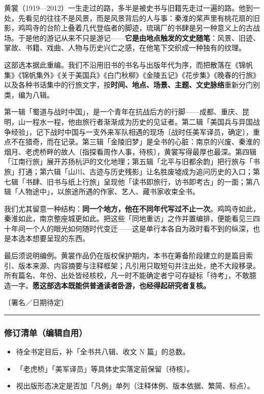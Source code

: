 \documentclass[UTF8,fontset=none,zihao=-4,a4paper]{ctexart}
\begin{document}
黄裳（1919—2012）一生走过的路，多半是被史书与旧籍先走过一遍的路。他到一处，先看见的往往不是风景，而是风景背后的人与事：秦淮的桨声里有桃花扇的旧影，鸡鸣寺的台阶上叠着几代登临者的脚迹，琉璃厂的书肆是另一种意义上的古战场。于是他的游记从来不只是游记——\textbf{它是由地点触发的文史随笔}：风景、旧迹、掌故、书籍、戏曲、人物与历史兴亡之感，在他笔下交织成一种独有的纹理。


这部选本据此重编。我们不沿用旧书的书名与出版年代为序，而把散落在《锦帆集》《锦帆集外》《关于美国兵》《白门秋柳》《金陵五记》《花步集》《晚春的行旅》以及各种书话集中的行旅文字，按\textbf{时间、地点、场景、主题、文史脉络}重新分门别类，编为八辑。


第一辑「蜀道与战时中国」，是一个青年在抗战后方的行脚——成都、重庆、昆明，山一程水一程，他由旅行者渐渐成为历史的见证者。第二辑「美国兵与异国战争经验」，记下战时中国与一支外来军队相遇的现场〔战时任美军译员，确定〕，重点不在猎奇，而在记录。第三辑「金陵旧梦」是全书的心脏：南京的兴废、秦淮的烟月、老虎桥畔的故人〔指探看周作人事，待核〕，黄裳写得最厚也最深。第四辑「江南行旅」展开苏扬杭沪的文化地理；第五辑「北平与旧都余韵」把行旅与「书旅」打通；第六辑「山川、古迹与历史残影」让名胜废墟成为追问历史的入口；第七辑「书肆、旧书与纸上行旅」呈现他「读书即旅行，访书即考古」的一面；第八辑「人物途中」，以旅途所遇的作家、艺人、藏书家收束全书。


我们尤其留意一种结构：\textbf{同一个地方，他在不同年代写过不止一次}。鸡鸣寺如此，秦淮如此，南京整座城更如此。把这些「同地重访」之作并置编排，便能看见三四十年间一个人的眼光如何随时代变迁——这是单行本各自为政时看不到的纵深，也是本选本想要呈现的东西。


最后须说明编例。黄裳作品仍在版权保护期内，本书在筹备阶段建立的是篇目索引、版本来源、内容摘要与注释框架；凡引用只取短句并注出处，绝不大段移录。所有篇名、年份、出处皆经核校，凡一时不能确定者宁可存疑标「待考」，不敢臆造一字。\textbf{愿这部选本既能供普通读者卧游，也经得起研究者复核。}


〔署名／日期待定〕


\medskip\hrule\medskip

\subsubsection{修订清单（编辑自用）}

\begin{itemize}
\item 待全书定目后，补「全书共八辑、收文 N 篇」的总数。
\item 「老虎桥」「美军译员」等具体史实落定前保留〔待核〕。
\item 视出版形态决定是否加「凡例」单列（注释体例、版本依据、繁简、标点）。
\end{itemize}
\end{document}
